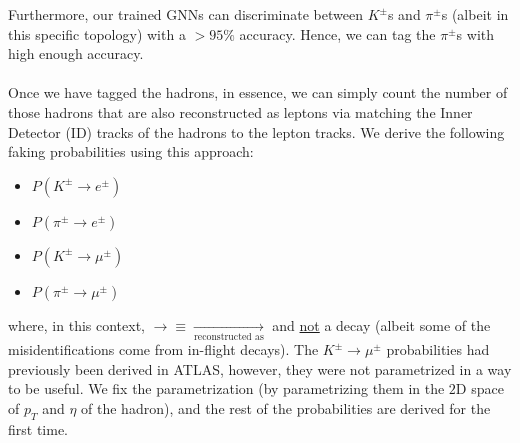 Furthermore, our trained GNNs can discriminate between $K^\pm$s and $\pi^\pm$s (albeit in this specific topology) with a $>95\%$ accuracy. Hence, we can tag the $\pi^\pm$s with high enough accuracy.
\\\\
Once we have tagged the hadrons, in essence, we can simply count the number of those hadrons that are also reconstructed as leptons via matching the Inner Detector (ID) tracks of the hadrons to the lepton tracks. %
We derive the following faking probabilities using this approach: 
\begin{itemize}
    \item $P(K^\pm \to e^\pm)$
    \item $P(\pi^\pm \to e^\pm)$
    \item $P(K^\pm \to \mu^\pm)$
    \item $P(\pi^\pm \to \mu^\pm)$
\end{itemize}
where, in this context, $\to\equiv \xrightarrow[\text{reconstructed as}]{}$ and \underline{not} a decay (albeit some of the misidentifications come from in-flight decays). The $K^\pm\to \mu^\pm$ probabilities had previously been derived in ATLAS, however, they were not parametrized in a way to be useful. We fix the parametrization (by parametrizing them in the $2$D space of $p_{T}$ and $\eta$ of the hadron), and the rest of the probabilities are derived for the first time.  %
%
%
